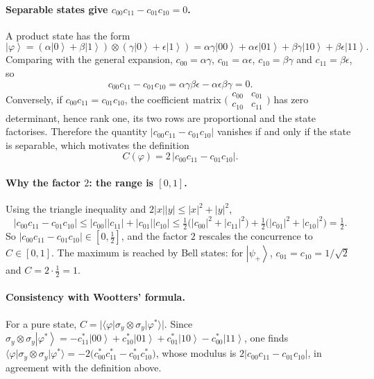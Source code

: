 \documentclass[11pt,a4paper]{article}
\newcommand{\ket}[1]{\left|#1\right\rangle}
\begin{document}
\paragraph{Separable states give $c_{00}c_{11}-c_{01}c_{10}=0$.}
A product state has the form
\begin{equation}
  \ket{\varphi}=(\alpha\ket{0}+\beta\ket{1})\otimes(\gamma\ket{0}+\epsilon\ket{1})
  =\alpha\gamma\ket{00}+\alpha\epsilon\ket{01}+\beta\gamma\ket{10}+\beta\epsilon\ket{11}.
\end{equation}
Comparing with the general expansion, $c_{00}=\alpha\gamma$, $c_{01}=\alpha\epsilon$, $c_{10}=\beta\gamma$ and $c_{11}=\beta\epsilon$, so
\begin{equation}
  c_{00}c_{11}-c_{01}c_{10}=\alpha\gamma\beta\epsilon-\alpha\epsilon\beta\gamma=0 .
\end{equation}
Conversely, if $c_{00}c_{11}=c_{01}c_{10}$, the coefficient matrix $\bigl(\begin{smallmatrix}c_{00}&c_{01}\\c_{10}&c_{11}\end{smallmatrix}\bigr)$ has zero determinant, hence rank one, its two rows are proportional and the state factorises. Therefore the quantity $\lvert c_{00}c_{11}-c_{01}c_{10}\rvert$ vanishes if and only if the state is separable, which motivates the definition
\begin{equation}
  C(\varphi)=2\,\lvert c_{00}c_{11}-c_{01}c_{10}\rvert .
\end{equation}

\paragraph{Why the factor $2$: the range is $[0,1]$.}
Using the triangle inequality and $2\lvert x\rvert\lvert y\rvert\le\lvert x\rvert^2+\lvert y\rvert^2$,
\begin{equation}
  \lvert c_{00}c_{11}-c_{01}c_{10}\rvert\le\lvert c_{00}\rvert\lvert c_{11}\rvert+\lvert c_{01}\rvert\lvert c_{10}\rvert
  \le\tfrac12\bigl(\lvert c_{00}\rvert^2+\lvert c_{11}\rvert^2\bigr)+\tfrac12\bigl(\lvert c_{01}\rvert^2+\lvert c_{10}\rvert^2\bigr)=\tfrac12 .
\end{equation}
So $\lvert c_{00}c_{11}-c_{01}c_{10}\rvert\in[0,\tfrac12]$, and the factor $2$ rescales the concurrence to $C\in[0,1]$. The maximum is reached by Bell states: for $\ket{\psi_+}$, $c_{01}=c_{10}=1/\sqrt2$ and $C=2\cdot\tfrac12=1$.

\paragraph{Consistency with Wootters' formula.}
For a pure state, $C=\lvert\langle\varphi\rvert\sigma_y\otimes\sigma_y\lvert\varphi^{*}\rangle\rvert$. Since $\sigma_y\otimes\sigma_y\ket{\varphi^{*}}=-c_{11}^{*}\ket{00}+c_{10}^{*}\ket{01}+c_{01}^{*}\ket{10}-c_{00}^{*}\ket{11}$, one finds $\langle\varphi\rvert\sigma_y\otimes\sigma_y\lvert\varphi^{*}\rangle=-2\bigl(c_{00}^{*}c_{11}^{*}-c_{01}^{*}c_{10}^{*}\bigr)$, whose modulus is $2\lvert c_{00}c_{11}-c_{01}c_{10}\rvert$, in agreement with the definition above.
\end{document}
